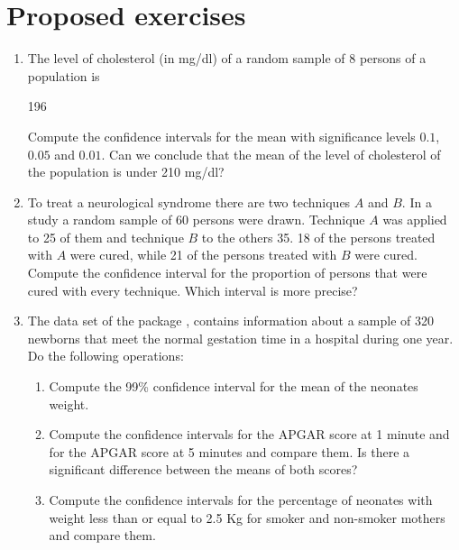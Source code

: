 \section{Proposed exercises}
\begin{enumerate}[leftmargin=*] 
\item  The level of cholesterol (in mg/dl) of a random sample of 8 persons of a population is
\begin{center}
196
\end{center}

Compute the confidence intervals for the mean with significance levels $0.1$, $0.05$ and $0.01$. 
Can we conclude that the mean of the level of cholesterol of the population is under 210 mg/dl?

\item To treat a neurological syndrome there are two techniques $A$ and $B$.
In a study a random sample of 60 persons were drawn.
Technique $A$ was applied to 25 of them and technique $B$ to the others 35.
18 of the persons treated with $A$ were cured, while 21 of the persons treated with $B$ were cured. 
Compute the confidence interval for the proportion of persons that were cured with every technique. 
Which interval is more precise?


\item The data set  of the package , contains information about a
sample of 320 newborns that meet the normal gestation time in a hospital during one year.
Do the following operations:
\begin{enumerate}
\item Compute the 99\% confidence interval for the mean of the neonates weight.
\item Compute the confidence intervals for the APGAR score at 1 minute and for the APGAR score at 5 minutes and compare
them. 
Is there a significant difference between the means of both scores?
\item Compute the confidence intervals for the percentage of neonates with weight less than or equal to 2.5 Kg for
smoker and non-smoker mothers and compare them.
\end{enumerate}
\end{enumerate}
